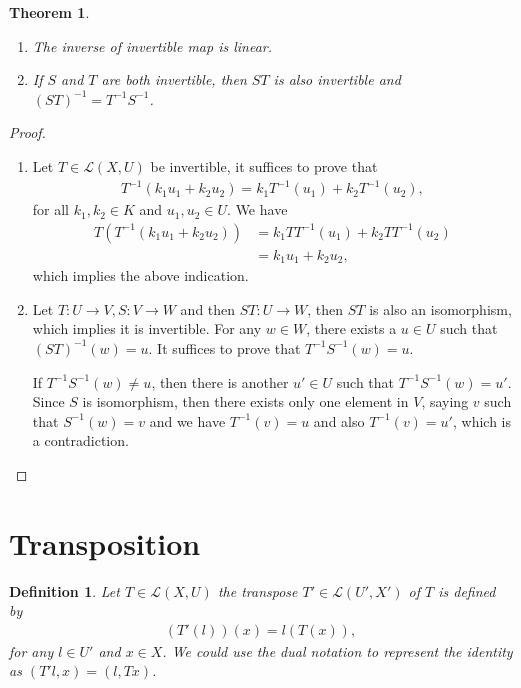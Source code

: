 \documentclass[10pt]{book}
\newtheorem{definition}{Definition}[chapter]
\newtheorem{theorem}{Theorem}[chapter]
\theoremstyle{definition}
\numberwithin{equation}{chapter}
\begin{document}
\begin{theorem}
~\begin{enumerate}[label=(\alph*)]
    \item The inverse of invertible map is linear.
    \item If $S$ and $T$ are both invertible, then $ST$ is also invertible and $(ST)^{-1} = T^{-1} S^{-1}$.
\end{enumerate}
\end{theorem}
\begin{proof}
~\begin{enumerate}[label=(\alph*)]
    \item Let $T\in \mathscr{L}(X,U)$ be invertible, it suffices to prove that 
    \begin{align*}
        T^{-1}(k_1 u_1+k_2 u_2) = k_1 T^{-1}(u_1) + k_2 T^{-1}(u_2),
    \end{align*}
    for all $k_1,k_2\in K$ and $u_1,u_2\in U$. We have
    \begin{align*}
        T \left(T^{-1}(k_1 u_1+k_2 u_2)\right) & = k_1 TT^{-1}(u_1) + k_2 TT^{-1}(u_2) \\
        & = k_1 u_1 + k_2 u_2,
    \end{align*}
    which implies the above indication.
    \item Let $T:U\to V, S:V\to W$ and then $ST:U\to W$, then $ST$ is also an isomorphism, which implies it is invertible. For any $w\in W$, there exists a $u\in U$ such that $(ST)^{-1}(w) = u$. It suffices to prove that $T^{-1} S^{-1}(w) = u$.
    
    If $T^{-1} S^{-1}(w)\neq u$, then there is another $u'\in U$ such that $T^{-1} S^{-1}(w) = u'$. Since $S$ is isomorphism, then there exists only one element in $V$, saying $v$ such that $S^{-1}(w) = v$ and we have $T^{-1}(v) = u$ and also $T^{-1}(v) = u'$, which is a contradiction.
\end{enumerate}
\end{proof}

\medskip

\section{Transposition}
\begin{definition}
Let $T\in \mathscr{L}(X,U)$ the transpose $T'\in \mathscr{L}(U',X')$ of $T$ is defined by 
\begin{align*}
    \left(T'(l)\right)(x) = l(T(x)),
\end{align*}
for any $l\in U'$ and $x\in X$. We could use the dual notation to represent the identity as $(T' l,x) = (l, Tx)$.
\end{definition}
\end{document}
